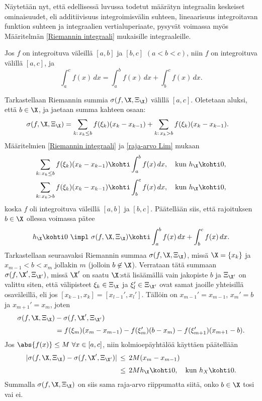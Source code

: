 Näytetään nyt, että edellisessä luvussa todetut määrätyn integraalin keskeiset ominaisuudet,
eli additiivisuus integroimisvälin suhteen, lineaarisuus integroitavan funktion suhteen ja
integraalien vertialuperiaate, pysyvät voimassa myös Määritelmän \ref{Riemannin integraali}
mukaisille integraaleille.
\begin{Lause} \label{integraalin additiivisuus} 
 Jos $f$ on integroituva väleillä $[a,b]$ ja $[b,c]$
$(a<b<c)$, niin $f$ on integroituva välillä $[a,c]$, ja
\[
\int_a^c f(x)\, dx=\int_a^b f(x)\, dx+\int_b^c f(x)\, dx.
\]
\end{Lause}
\tod Tarkastellaan Riemannin summia $\sigma(f,\X,\Xi_\X)$ välillä $[a,c]$. Oletetaan aluksi,
että $b\in\X$, ja jaetaan summa kahteen osaan:
\begin{align*}
\sigma(f,\X,\Xi_\X) &= \sum_{k:\,x_k\leq b} f(\xi_k)(x_k-x_{k-1}) 
                         + \sum_{k:\,x_k> b} f(\xi_k)(x_k-x_{k-1}).
\end{align*}
Määritelmien \ref{Riemannin integraali} ja \ref{raja-arvo Lim} mukaan
\begin{align*}
\sum_{k:\,x_k\leq b} f(\xi_k)(x_k-x_{k-1}) 
                &\kohti \int_a^b f(x)\, dx, \quad \text{kun}\ h_\X \kohti 0, \\
\sum_{k:\,x_k> b} f(\xi_k)(x_k-x_{k-1})    
                &\kohti \int_b^c f(x)\, dx, \quad \text{kun}\ h_\X \kohti 0,
\end{align*}
koska $f$ oli integroituva väleillä $[a,b]$ ja $[b,c]$. Päätellään siis, että rajoituksen 
$b\in\X$ ollessa voimassa pätee
\[
h_\X\kohti 0 \ \impl \ \sigma(f,\X,\Xi_\X)\kohti\int_a^b f(x)\, dx+\int_b^c f(x)\, dx.
\]
Tarkastellaan seuraavaksi Riemannin summaa $\sigma(f,\X,\Xi_\X)$, missä $\X=\{x_k\}$ ja 
$x_{m-1}<b<x_m$ jollakin $m$ (jolloin $b\not\in\X$). Verrataan tätä summaan 
$\sigma(f,\X',\Xi_{\X'})$, missä $\X'$ on saatu $\X$:stä lisäämällä vain jakopiste $b$ ja
$\Xi_{\X'}$ on valittu siten, että välipisteet $\xi_k\in \Xi_{\X}$ ja $\xi_l'\in\Xi_{\X'}$ ovat
samat jaoille yhteisillä osaväleillä, eli jos $[x_{k-1},x_k]=[x_{l-1}',x_l']$. Tällöin on
$x_{m-1}'=x_{m-1}$, $x_m'=b$ ja $x_{m+1}'=x_m$, joten
\begin{align*}
\sigma(f,\X,\Xi_\X)&-\sigma(f,\X',\Xi_{\X'}) \\[1mm]
                   &=f(\xi_m)(x_m-x_{m-1})-f(\xi_m')(b-x_m)-f(\xi_{m+1}')(x_{m+1}-b).
\end{align*}
Jos $\abs{f(x)}\leq M \ \forall x\in [a,c]$, niin kolmioepäyhtälöä käyttäen päätellään
\begin{align*}
|\sigma(f,\X,\Xi_\X)-\sigma(f,\X',\Xi_{\X'})|
         &\,\le\, 2M(x_m-x_{m-1}) \\[1mm]
         &\,\le\, 2Mh_\X \kohti 0,\quad \text{kun}\ h_X \kohti 0.
\end{align*}
Summalla $\sigma(f,\X,\Xi_\X)$ on siis sama raja-arvo riippumatta siitä, onko $b\in\X$ tosi vai
ei. \loppu

